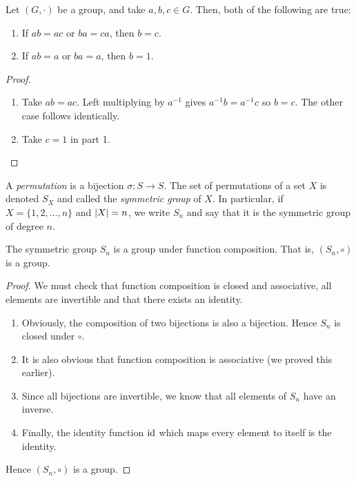 \begin{proposition}
  Let $(G, \cdot)$ be a group, and take $a, b, c \in G$. Then, both of the following are true:
  \begin{enumerate}
    \item If $ab = ac$ or $ba = ca$, then $b = c$.
    \item If $ab = a$ or $ba = a$, then $b = 1.$
  \end{enumerate}
\end{proposition}
\begin{proof}\phantom{}
  \begin{enumerate}
    \item Take $ab = ac$. Left multiplying by $a^{-1}$ gives $a^{-1}b = a^{-1}c$ so $b = c$. The other case follows identically.
    \item Take $c = 1$ in part 1.
  \end{enumerate}
\end{proof}

\begin{definition}
  A \emph{permutation} is a bijection $\sigma \colon S \to S$. The set of permutations of a set $X$ is denoted $S_X$ and called the \emph{symmetric group} of $X$. In particular, if $X = \{1, 2, \dots, n\}$ and $\lvert X\rvert = n$, we write $S_n$ and say that it is the symmetric group of degree  $n$.
\end{definition}

\begin{proposition}
  The symmetric group  $S_n$ is a group under function composition. That is, $(S_n, \circ)$ is a group.
\end{proposition}
\begin{proof}
  We must check that function composition is closed and associative, all elements are invertible and that there exists an identity.
  \begin{enumerate}
    \item Obviously, the composition of two bijections is also a bijection. Hence $S_n$ is closed under $\circ$.
    \item It is also obvious that function composition is associative (we proved this earlier).
    \item Since all bijections are invertible, we know that all elements of $S_n$ have an inverse.
    \item Finally, the identity function $\operatorname{id}$ which maps every element to itself is the identity.
  \end{enumerate}
  Hence $(S_n, \circ)$ is a group.
\end{proof}

